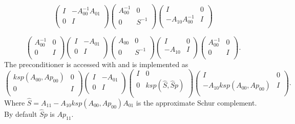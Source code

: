 \[
\left( \begin{array}{cc}
I   & -A_{00}^{-1} A_{01} \\
0 & I \\
\end{array} \right)
\left( \begin{array}{cc}
A_{00}^{-1}  & 0 \\
0 & S^{-1} \\
\end{array} \right)
\left( \begin{array}{cc}
I   & 0 \\
-A_{10}A_{00}^{-1} & I \\
\end{array} \right)
\]

\[
\left( \begin{array}{cc}
A_{00}^{-1}   & 0 \\
0 & I \\
\end{array} \right)
\left( \begin{array}{cc}
I   & -A_{01} \\
0 & I \\
\end{array} \right)
\left( \begin{array}{cc}
A_{00}  & 0 \\
0 & S^{-1} \\
\end{array} \right)
\left( \begin{array}{cc}
I   & 0 \\
-A_{10} & I \\
\end{array} \right)
\left( \begin{array}{cc}
A_{00}^{-1}   & 0 \\
0 & I \\
\end{array} \right).
\]
The preconditioner is accessed with  and is implemented as
\[
\left( \begin{array}{cc}
ksp(A_{00},Ap_{00})   & 0 \\
0 & I \\
\end{array} \right)
\left( \begin{array}{cc}
I   & -A_{01} \\
0 & I \\
\end{array} \right)
\left( \begin{array}{cc}
I  & 0 \\
0 & ksp(\hat{S},\hat{S}p) \\
\end{array} \right)
\left( \begin{array}{cc}
I   & 0 \\
-A_{10} ksp(A_{00},Ap_{00}) & I \\
\end{array} \right).
\]
Where $\hat{S} = A_{11} - A_{10} ksp(A_{00},Ap_{00}) A_{01}$ is the approximate Schur complement. By default $\hat{S}p$ is $Ap_{11}.$

